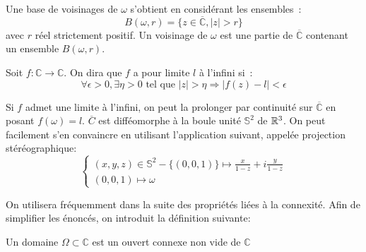 Une base de voisinages de $\omega$ s'obtient en considérant les
ensembles~:
\[
B(\omega,r) = \{ z \in   \overline{\mathbb{C}}, |z| > r \}
\]
avec $r$ réel strictement positif.
Un voisinage de $\omega$ est une partie de $\overline{\mathbb{C}}$
contenant un ensemble $B(\omega, r)$.
\begin{fdefn}
Soit $f : \mathbb{C} \to \mathbb{C}$. On dira que $f$ a pour limite
$l$ à l'infini si~:
\[
\forall \epsilon > 0, \exists \eta > 0 \mbox { tel que } |z| > \eta
\Rightarrow |f(z) -l| < \epsilon
\]
\end{fdefn}
Si $f$ admet une limite à l'infini, on peut la prolonger par
continuité sur $\overline{\mathbb{C}}$ en posant $f(\omega) =l$.
$\overline{C}$ est difféomorphe à la boule unité $\mathbb{S}^2$ de $\mathbb{R}^3$. On peut facilement s'en convaincre en utilisant l'application suivant, appelée projection stéréographique:
\[
\begin{cases}
(x,y,z) \in \mathbb{S}^2-\{(0,0,1)\} \mapsto \frac{x}{1-z} + i \frac{y}{1-z} \\
(0,0 ,1) \mapsto \omega
\end{cases}
\]

On utilisera fréquemment dans la suite des propriétés liées à la connexité. Afin
de simplifier les énoncés, on introduit la définition suivante:
\begin{fdefn}
Un domaine $\Omega \subset \mathbb{C}$ est un ouvert connexe non vide de
$\mathbb{C}$
\end{fdefn}

